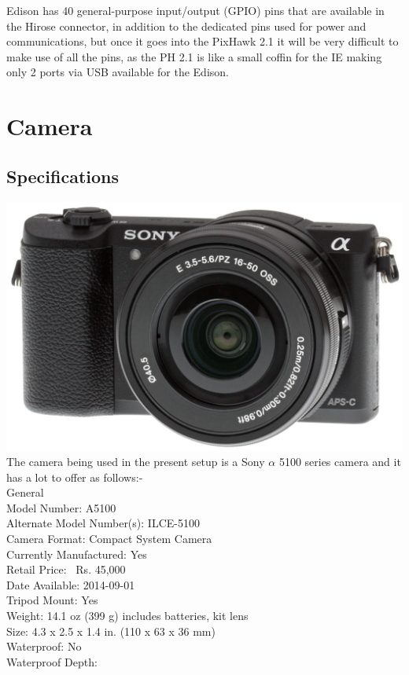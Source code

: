 \documentclass[12pt]{report}
\begin{document}
 Edison has 40 general-purpose input/output
(GPIO) pins that are available in the Hirose connector, in addition to the dedicated pins
used for power and communications, but once it goes into the PixHawk 2.1 it will be very difficult to make use of all the pins, as the PH 2.1 is like a small coffin for the IE making only 2 ports via USB available for the Edison.

\chapter{Camera}
\section{Specifications}
\includegraphics[width=\linewidth]{Camera.jpg}
\\
The camera being used in the present setup is a Sony $\alpha$ 5100 series camera and it has a lot to offer as follows:-
\\
\newpage
General
\\
Model Number:
A5100
\\Alternate Model Number(s):
ILCE-5100
\\Camera Format:
Compact System Camera
\\Currently Manufactured:
Yes
\\Retail Price:
~Rs. 45,000
\\Date Available:
2014-09-01
\\Tripod Mount:
Yes
\\Weight:
14.1 oz (399 g) 
includes batteries, kit lens 
\\Size:
4.3 x 2.5 x 1.4 in.
(110 x 63 x 36 mm) 
\\Waterproof:
No
\\Waterproof Depth:
\end{document}
